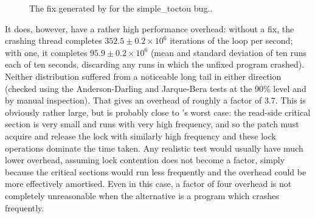 \begin{figure}
  \hfill %
  \hfill
  \caption{The fix generated by {\implementation} for the simple\_toctou bug..}
  \label{fig:eval:simple_toctou:fix}
\end{figure}

It does, however, have a rather high performance overhead: without a
fix, the crashing thread completes $352.5 \pm 0.2 {\times} 10^6$
iterations of the loop per second; with one, it completes $95.9 \pm
0.2 {\times} 10^6$ (mean and standard deviation of ten runs each of
ten seconds, discarding any runs in which the unfixed program
crashed).  Neither distribution suffered from a noticeable long tail
in either direction (checked using the Anderson-Darling and
Jarque-Bera tests at the 90\% level and by manual inspection).  That
gives an overhead of roughly a factor of 3.7.  This is obviously
rather large, but is probably close to {\technique}'s worst case: the
read-side critical section is very small and runs with very high
frequency, and so the patch must acquire and release the lock with
similarly high frequency and these lock operations dominate the time
taken.  Any realistic test would usually have much lower overhead,
assuming lock contention does not become a factor, simply because the
critical sections would run less frequently and the overhead could be
more effectively amortised.  Even in this case, a factor of four
overhead is not completely unreasonable when the alternative is a
program which crashes frequently.

